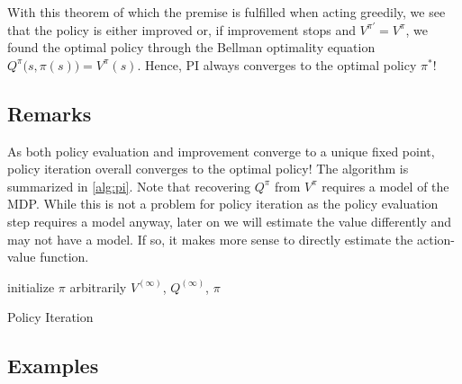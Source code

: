 			With this theorem of which the premise is fulfilled when acting greedily, we see that the policy is either improved or, if improvement stops and \( V^{\pi'} = V^\pi \), we found the optimal policy through the Bellman optimality equation \( Q^\pi\bigl( s, \pi(s) \bigr) = V^\pi(s) \). Hence, \ac{PI} always converges to the optimal policy \(\pi^\ast\)!

		\subsection{Remarks}
			As both policy evaluation and improvement converge to a unique fixed point, policy iteration overall converges to the optimal policy! The algorithm is summarized in \autoref{alg:pi}. Note that recovering \(Q^\pi\) from \(V^\pi\) requires a model of the \ac{MDP}. While this is not a problem for policy iteration as the policy evaluation step requires a model anyway, later on we will estimate the value differently and may not have a model. If so, it makes more sense to directly estimate the action-value function.

			\begin{algorithm}  \DontPrintSemicolon
				initialize \( \pi \) arbitrarily \;
				\Return \( V^{(\infty)} \), \( Q^{(\infty)} \), \( \pi \)
				\caption{Policy Iteration}
				\label{alg:pi}
			\end{algorithm}

		\subsection{Examples}


